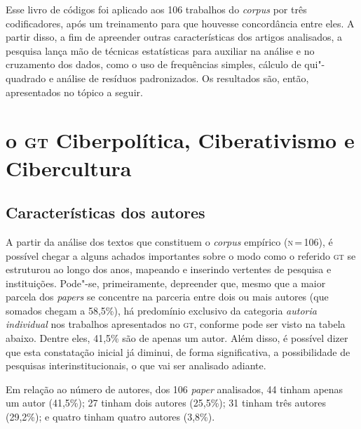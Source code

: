 Esse livro de códigos foi aplicado aos 106 trabalhos do \textit{corpus}
por três codificadores, após um treinamento para que houvesse
concordância entre eles. A partir disso, a fim de apreender outras
características dos artigos analisados, a pesquisa lança mão de técnicas
estatísticas para auxiliar na análise e no cruzamento dos dados, como o
uso de frequências simples, cálculo de qui"-quadrado e análise de
resíduos padronizados. Os resultados são, então, apresentados no tópico
a seguir.

\section{o \textsc{gt} Ciberpolítica, Ciberativismo e
Cibercultura}

\subsection{Características dos autores}

A partir da análise dos textos que constituem o \textit{corpus} empírico
(\textsc{n}\,=\,106), é possível chegar a alguns achados importantes sobre o modo
como o referido \textsc{gt} se estruturou ao longo dos anos, mapeando e inserindo
vertentes de pesquisa e instituições. Pode"-se, primeiramente, depreender
que, mesmo que a maior parcela dos \textit{papers} se concentre na
parceria entre dois ou mais autores (que somados chegam a 58,5\%), há
predomínio exclusivo da categoria \textit{autoria individual} nos trabalhos
apresentados no \textsc{gt}, conforme pode ser visto na tabela abaixo. Dentre
eles, 41,5\% são de apenas um autor. Além disso, é possível dizer
que esta constatação inicial já diminui, de forma significativa, a
possibilidade de pesquisas interinstitucionais, o que vai ser analisado
adiante.

Em relação ao número de autores, dos 106 \textit{paper} analisados, 44 tinham apenas um autor (41,5\%); 27 tinham dois autores (25,5\%); 31 tinham três autores (29,2\%); e quatro tinham quatro autores (3,8\%).

